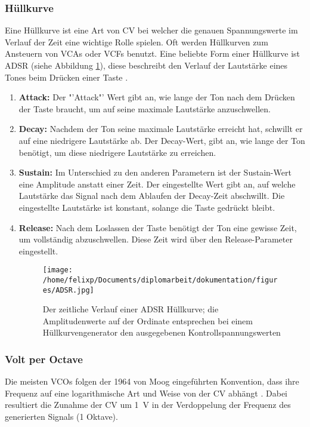 \subsubsection{Hüllkurve}
\label{sec:org54d1e2c}
Eine Hüllkurve ist eine Art von \acl{CV} bei welcher die genauen Spannungswerte im Verlauf der Zeit eine wichtige Rolle spielen. Oft werden Hüllkurven zum Ansteuern von \acp{VCA} oder \acp{VCF} benutzt. Eine beliebte Form einer Hüllkurve ist \ac{ADSR} (siehe Abbildung \ref{fig:org0cd783e}), diese beschreibt den Verlauf der Lautstärke eines Tones beim Drücken einer Taste \cite{envelopes}.

\begin{enumerate}
\item \textbf{Attack:}
\label{sec:org92dc7d9}
Der "'Attack"' Wert gibt an, wie lange der Ton nach dem Drücken der Taste braucht, um auf seine maximale Lautstärke anzuschwellen.

\item \textbf{Decay:}
\label{sec:org1599ac8}
Nachdem der Ton seine maximale Lautstärke erreicht hat, schwillt er auf eine niedrigere Lautstärke ab. Der Decay-Wert, gibt an, wie lange der Ton benötigt, um diese niedrigere Lautstärke zu erreichen.

\item \textbf{Sustain:}
\label{sec:org5eddaf9}
Im Unterschied zu den anderen Parametern ist der Sustain-Wert eine Amplitude anstatt einer Zeit. Der eingestellte Wert gibt an, auf welche Lautstärke das Signal nach dem Ablaufen der Decay-Zeit abschwillt. Die eingestellte Lautstärke ist konstant, solange die Taste gedrückt bleibt.

\item \textbf{Release:}
\label{sec:orgb31729c}
Nach dem Loslassen der Taste benötigt der Ton eine gewisse Zeit, um vollständig abzuschwellen.  Diese Zeit wird über den Release-Parameter eingestellt.

\begin{figure}[htbp]
\centering
\texttt{[image: /home/felixp/Documents/diplomarbeit/dokumentation/figures/ADSR.jpg]}
\caption{\label{fig:org0cd783e}Der zeitliche Verlauf einer ADSR Hüllkurve; die Amplitudenwerte auf der Ordinate entsprechen bei einem Hüllkurvengenerator den ausgegebenen Kontrollspannungswerten  \cite{envelopes}}
\end{figure}
\end{enumerate}

\subsubsection{Volt per Octave}
\label{sec:org32027af}
Die meisten \acsp{VCO} folgen der 1964 von Moog eingeführten Konvention, dass ihre Frequenz auf eine logarithmische Art und Weise von der \acl{CV} abhängt \cite{moog1964}. Dabei resultiert die Zunahme der \acl{CV} um \SI{1}{\volt} in der Verdoppelung der Frequenz des generierten Signals (1 Oktave).


